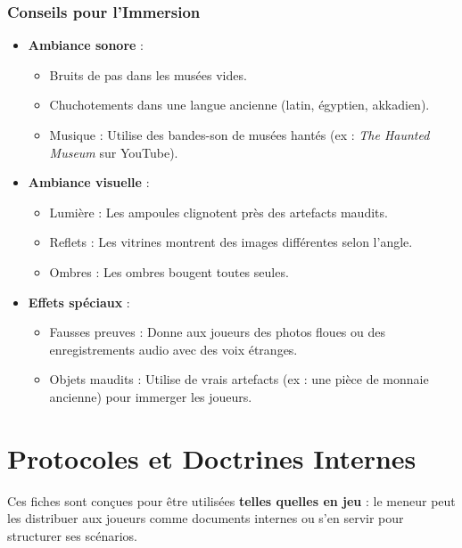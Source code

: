 \documentclass[10pt,a5paper,twoside]{book}
\begin{document}
\subsection{Conseils pour l'Immersion}
\begin{itemize}
\item \textbf{Ambiance sonore} :
	\begin{itemize}
		\item Bruits de pas dans les musées vides.
		\item Chuchotements dans une langue ancienne (latin, égyptien, akkadien).
		\item Musique : Utilise des bandes-son de musées hantés (ex : \textit{The Haunted Museum} sur YouTube).
	\end{itemize}

\item \textbf{Ambiance visuelle} :
	\begin{itemize}
		\item Lumière : Les ampoules clignotent près des artefacts maudits.
		\item Reflets : Les vitrines montrent des images différentes selon l'angle.
		\item Ombres : Les ombres bougent toutes seules.
	\end{itemize}

\item \textbf{Effets spéciaux} :
	\begin{itemize}
		\item Fausses preuves : Donne aux joueurs des photos floues ou des enregistrements audio avec des voix étranges.
		\item Objets maudits : Utilise de vrais artefacts (ex : une pièce de monnaie ancienne) pour immerger les joueurs.
	\end{itemize}
\end{itemize}






\chapter{Protocoles et Doctrines Internes}

Ces fiches sont conçues pour être utilisées \textbf{telles quelles en jeu} : le meneur peut les distribuer aux joueurs comme \og documents internes \fg{} ou s'en servir pour structurer ses scénarios.
\end{document}
